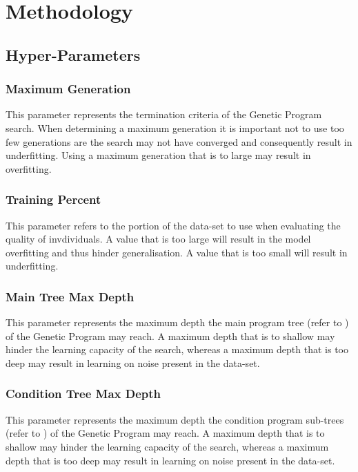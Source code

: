 \documentclass[a4paper,12pt]{article}
\begin{document}
\section{Methodology} \label{sec:methodology}
    \subsection{Hyper-Parameters}
        \subsubsection*{Maximum Generation} \label{subsubsec:mg}
            \par{
                \noindent
                This parameter represents the termination criteria of the Genetic Program search. When determining a maximum generation it is important 
                not to use too few generations are the search may not have converged and consequently result in underfitting. Using a maximum 
                generation that is to large may result in overfitting.  
            }
        \subsubsection*{Training Percent} \label{subsubsec:kf}
            \par{
                \noindent
                This parameter refers to the portion of the data-set to use when evaluating the quality of invdividuals. 
                A value that is too large will result in the model overfitting and thus hinder generalisation. A value that is too small will result 
                in underfitting.
            }
        \subsubsection*{Main Tree Max Depth} \label{subsubsec:mmd}
            \par{
                \noindent 
                This parameter represents the maximum depth the main program tree (refer to ) of the Genetic Program may reach. A maximum depth that is to shallow may 
                hinder the learning capacity of the search, whereas a maximum depth that is too deep may result in learning on noise present in the data-set. 
            }
        \subsubsection*{Condition Tree Max Depth} \label{subsubsec:cmd}
            \par{
                \noindent 
                This parameter represents the maximum depth the condition program sub-trees (refer to ) of the Genetic Program may reach. A maximum depth that is to shallow may 
                hinder the learning capacity of the search, whereas a maximum depth that is too deep may result in learning on noise present in the data-set. 
            }
\end{document}
